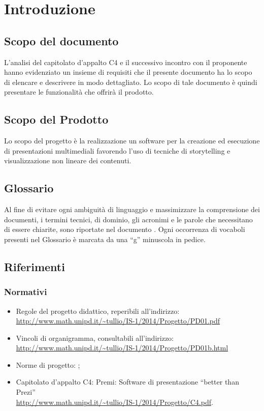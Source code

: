 \section{Introduzione}
\subsection{Scopo del documento}
L’analisi del capitolato d’appalto C4 e il successivo incontro con il proponente hanno evidenziato un insieme di requisiti che il presente documento ha lo scopo di elencare e descrivere in modo dettagliato. Lo scopo di tale documento è quindi presentare le funzionalità che offrirà il prodotto.
\subsection{Scopo del Prodotto}
Lo scopo del progetto è la realizzazione un software per la creazione ed esecuzione di presentazioni multimediali favorendo l’uso di tecniche di storytelling e visualizzazione non lineare dei contenuti.
\subsection{Glossario}
Al fine di evitare ogni ambiguità di linguaggio e massimizzare la comprensione dei documenti, i termini tecnici, di dominio, gli acronimi e le parole che necessitano di essere chiarite, sono riportate nel documento \href{run:../../Esterni/\fGlossario}{\fEscapeGlossario}. Ogni occorrenza di vocaboli presenti nel Glossario è marcata da una “g” minuscola in pedice.
\subsection{Riferimenti}
\subsubsection{Normativi}

\begin{itemize}
\item Regole del progetto didattico, reperibili all'indirizzo:\\ \url{http://www.math.unipd.it/~tullio/IS-1/2014/Progetto/PD01.pdf}
\item Vincoli di organigramma, consultabili all’indirizzo:\\ \url{http://www.math.unipd.it/~tullio/IS-1/2014/Progetto/PD01b.html}
\item Norme di progetto: \href{run:../../Interni/\fNormeDiProgetto}{\fEscapeNormeDiProgetto};
\item Capitolato d’appalto C4: Premi: Software di presentazione “better than Prezi” \\
\url{http://www.math.unipd.it/~tullio/IS-1/2014/Progetto/C4.pdf}.
\end{itemize}

